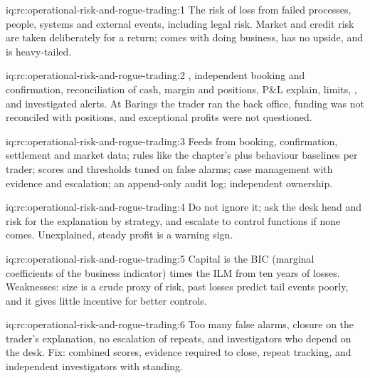 \begin{solution}{iq:rc:operational-risk-and-rogue-trading:1}
The risk of loss from failed processes, people, systems and external events, including legal risk.
Market and credit risk are taken deliberately for a return;  comes with doing business,
has no upside, and is heavy-tailed.
\end{solution}

\begin{solution}{iq:rc:operational-risk-and-rogue-trading:2}
, independent booking and confirmation, reconciliation of cash, margin and
positions, P\&L explain, limits, , and investigated alerts. At Barings the trader ran the back
office, funding was not reconciled with positions, and exceptional profits were not questioned.
\end{solution}

\begin{solution}{iq:rc:operational-risk-and-rogue-trading:3}
Feeds from booking, confirmation, settlement and market data; rules like the chapter's plus behaviour
baselines per trader; scores and thresholds tuned on false alarms; case management with evidence and
escalation; an append-only audit log; independent ownership.
\end{solution}

\begin{solution}{iq:rc:operational-risk-and-rogue-trading:4}
Do not ignore it; ask the desk head and risk for the explanation by strategy, and escalate to control
functions if none comes. Unexplained, steady profit is a warning sign.
\end{solution}

\begin{solution}{iq:rc:operational-risk-and-rogue-trading:5}
Capital is the BIC (marginal coefficients of the business indicator) times the ILM from ten years of
losses. Weaknesses: size is a crude proxy of risk, past losses predict tail events poorly, and it gives
little incentive for better controls.
\end{solution}

\begin{solution}{iq:rc:operational-risk-and-rogue-trading:6}
Too many false alarms, closure on the trader's explanation, no escalation of repeats, and investigators
who depend on the desk. Fix: combined scores, evidence required to close, repeat tracking, and
independent investigators with standing.
\end{solution}
